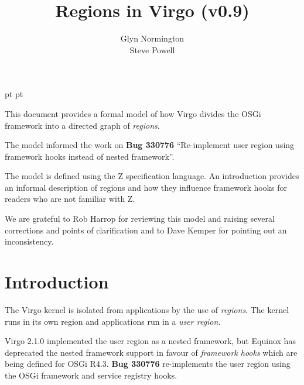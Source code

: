\documentclass[a4paper,9pt,twoside]{article}
\begin{document}
 pt
 pt

\title{Regions in Virgo (v0.9)}
\author{Glyn Normington\\Steve Powell}

\maketitle
\thispagestyle{myheadings}
\setcounter{page}{0}

This document provides a formal model of how Virgo divides the OSGi framework into a directed graph
of \textit{regions}.

The model informed the work on \textbf{Bug 330776} ``Re-implement user region using
framework hooks instead of nested framework''.

The model is defined using the Z specification language. An introduction provides an informal
description of regions and how they influence framework hooks for readers who are not familiar with Z.

We are grateful to Rob Harrop for reviewing this model and raising several corrections and
points of clarification and to Dave Kemper for pointing out an inconsistency.

\clearpage
{}
\tableofcontents

\newcommand{\true}{true}
\newcommand{\false}{false}
\renewcommand{\emptyset}{\varnothing}
\newcommand{\ModuleDefZero}{ModuleDef_0}
\newcommand{\ModuleDefOne}{ModuleDef_1}
\newcommand{\ModuleDefTwo}{ModuleDef_2}
\newcommand{\ModuleDefThree}{ModuleDef_3}
\newcommand{\ModuleDefFour}{ModuleDef_4}

\clearpage
{}
\section{Introduction}
\label{cha:intro}

The Virgo kernel is isolated from applications by the use of \textit{regions}.
The kernel runs in its own region and applications run in a \textit{user region}.

Virgo 2.1.0 implemented the user region as a nested framework, but Equinox
has deprecated the nested framework support in favour of \textit{framework hooks}
which are being defined for OSGi R4.3.
\textbf{Bug 330776} re-implements the user region using the OSGi framework and service
registry hooks.
\end{document}

